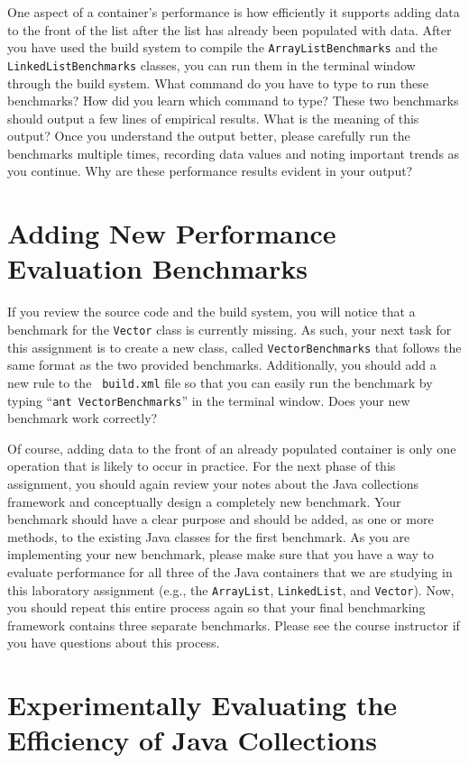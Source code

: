 One aspect of a container's performance is how efficiently it supports adding data to the front of the list after the
list has already been populated with data. After you have used the build system to compile the {\tt ArrayListBenchmarks}
and the {\tt LinkedListBenchmarks} classes, you can run them in the terminal window through the build system. What
command do you have to type to run these benchmarks? How did you learn which command to type? These two benchmarks
should output a few lines of empirical results. What is the meaning of this output? Once you understand the output
better, please carefully run the benchmarks multiple times, recording data values and noting important trends as you
continue. Why are these performance results evident in your output?

\section*{Adding New Performance Evaluation Benchmarks}

If you review the source code and the build system, you will notice that a benchmark for the {\tt Vector} class is
currently missing. As such, your next task for this assignment is to create a new class, called {\tt VectorBenchmarks}
that follows the same format as the two provided benchmarks. Additionally, you should add a new rule to the {\tt
build.xml} file so that you can easily run the benchmark by typing ``{\tt ant VectorBenchmarks}'' in the terminal
window. Does your new benchmark work correctly?

Of course, adding data to the front of an already populated container is only one operation that is likely to occur in
practice. For the next phase of this assignment, you should again review your notes about the Java collections framework
and conceptually design a completely new benchmark. Your benchmark should have a clear purpose and should be added, as
one or more methods, to the existing Java classes for the first benchmark. As you are implementing your new benchmark,
please make sure that you have a way to evaluate performance for all three of the Java containers that we are studying
in this laboratory assignment (e.g., the {\tt ArrayList}, {\tt LinkedList}, and {\tt Vector}). Now, you should repeat
this entire process again so that your final benchmarking framework contains three separate benchmarks. Please see the
course instructor if you have questions about this process.

\section*{Experimentally Evaluating the Efficiency of Java Collections}

